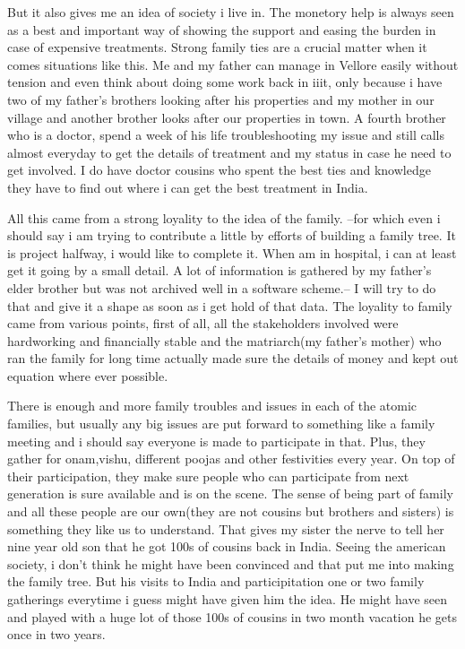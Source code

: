 But it also gives me an idea of society i live in. The monetory help is always seen as a best and important way of showing the support and easing the burden in case of expensive treatments. Strong family ties are a crucial matter when it comes situations like this. Me and my father can manage in Vellore easily without tension and even think about doing some work back in iiit, only because i have two of my father's brothers looking after his properties and my mother in our village and another brother looks after our properties in town. A fourth brother who is a doctor, spend a week of his life troubleshooting my issue and still calls almost everyday to get the details of treatment and my status in case he need to get involved. I do have doctor cousins who spent the best ties and knowledge they have to find out where i can get the best treatment in India. 

All this came from a strong loyality to the idea of the family. --for which even i should say i am trying to contribute a little by efforts of building a family tree. It is project halfway, i would like to complete it. When am in hospital, i can at least get it going by a small detail. A lot of information is gathered by my father's elder brother but was not archived well in a software scheme.-- I will try to do that and give it a shape as soon as i get hold of that data. The loyality to family came from various points, first of all, all the stakeholders involved were hardworking and financially stable and the matriarch(my father's mother) who ran the family for long time actually made sure the details of money and kept out equation where ever possible. 

There is enough and more family troubles and issues in each of the atomic families, but usually any big issues are put forward to something like a family meeting and i should say everyone is made to participate in that. Plus, they gather for onam,vishu, different poojas and other festivities every year. On top of their participation, they make sure people who can participate from next generation is sure available and is on the scene. The sense of being part of family and all these people are our own(they are not cousins but brothers and sisters) is something they like us to understand. That gives my sister the nerve to tell her nine year old son that he got 100s of cousins back in India. Seeing the american society, i don't think he might have been convinced and that put me into making the family tree. But his visits to India and participitation one or two family gatherings everytime i guess might have given him the idea. He might have seen and played with a huge lot of those 100s of cousins in two month vacation he gets once in two years. 

